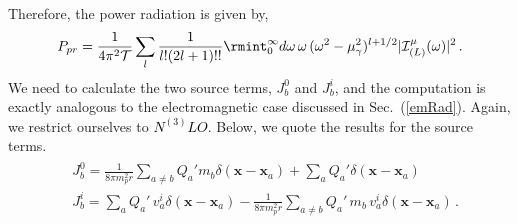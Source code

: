 Therefore, the power radiation is given by,
\begin{align}
    \begin{split}
        P_{pr}=\frac{1}{4\pi^2\mathcal{T}}\sum_{l}\frac{1}{l!(2l+1)!!}\rmint_0^\infty d\omega\,\omega\,(\omega^2-\mu_{\gamma}^2)^{l+1/2}|\mathcal{I}^{\mu}_{(L)}(\omega)|^2\,.
    \end{split}
\end{align}
 We need to calculate the two source terms, $J_{b}^{0}$ and $J_{b}^{i}$, and the computation is exactly analogous to the electromagnetic case discussed in Sec.~(\ref{emRad}). Again, we restrict ourselves to \textcolor{black}{$N^{(3)}LO$}. Below, we quote the results for the source terms. 
\begin{align}
    \begin{split}
      &  J_{b}^{0}=\frac{1}{8\pi m_p^2 r}\sum_{a\neq b}Q_{a}'m_b\delta(\boldsymbol{x}-\boldsymbol{x}_a)+\sum_{a}Q_a'\delta(\boldsymbol{x}-\boldsymbol{x}_a)\,\\ &
      J_{b}^{i}=\sum_{a}Q_{a}'\,v_a^{i}\delta(\boldsymbol{x}-\boldsymbol{x}_a)-\frac{1}{8\pi m_p^2 r}\sum_{a\ne b}Q_a'\, m_b \,v_a^{i}\delta(\boldsymbol{x}-\boldsymbol{x}_a)\,.
    \end{split}
\end{align}
